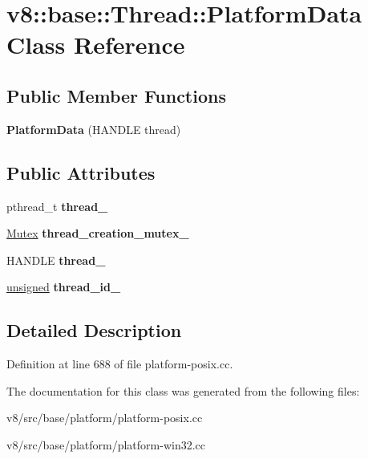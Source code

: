 \hypertarget{classv8_1_1base_1_1Thread_1_1PlatformData}{}\section{v8\+:\+:base\+:\+:Thread\+:\+:Platform\+Data Class Reference}
\label{classv8_1_1base_1_1Thread_1_1PlatformData}
\subsection*{Public Member Functions}
\begin{DoxyCompactItemize}
\item 
\mbox{\label{classv8_1_1base_1_1Thread_1_1PlatformData_ae37fb80a5cf240ca10435552653cf87b}} 
{\bfseries Platform\+Data} (H\+A\+N\+D\+LE thread)
\end{DoxyCompactItemize}
\subsection*{Public Attributes}
\begin{DoxyCompactItemize}
\item 
\mbox{\label{classv8_1_1base_1_1Thread_1_1PlatformData_a1d17ab6fadf784dc0c53a1a6e6108969}} 
pthread\+\_\+t {\bfseries thread\+\_\+}
\item 
\mbox{\label{classv8_1_1base_1_1Thread_1_1PlatformData_a5822687e07ab3a414b12712f828b637f}} 
\mbox{\hyperlink{classv8_1_1base_1_1Mutex}{Mutex}} {\bfseries thread\+\_\+creation\+\_\+mutex\+\_\+}
\item 
\mbox{\label{classv8_1_1base_1_1Thread_1_1PlatformData_a5dda2be4239e78fa4b5d5db197665452}} 
H\+A\+N\+D\+LE {\bfseries thread\+\_\+}
\item 
\mbox{\label{classv8_1_1base_1_1Thread_1_1PlatformData_a1c0d095a22bab8a4be281c96be6a5ca2}} 
\mbox{\hyperlink{classunsigned}{unsigned}} {\bfseries thread\+\_\+id\+\_\+}
\end{DoxyCompactItemize}


\subsection{Detailed Description}


Definition at line 688 of file platform-\/posix.\+cc.



The documentation for this class was generated from the following files\+:\begin{DoxyCompactItemize}
\item 
v8/src/base/platform/platform-\/posix.\+cc\item 
v8/src/base/platform/platform-\/win32.\+cc\end{DoxyCompactItemize}
